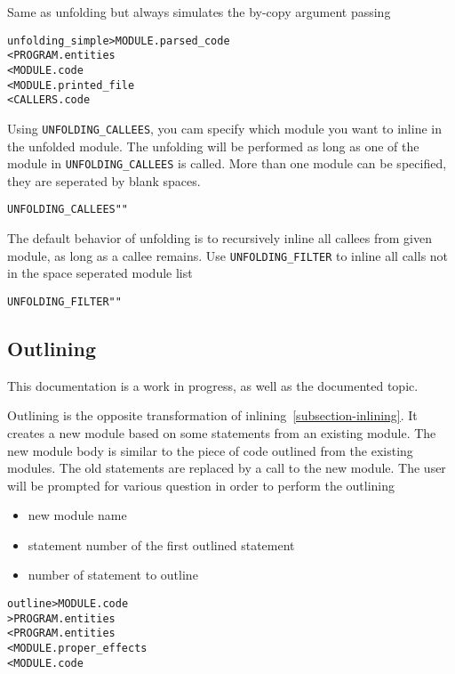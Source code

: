 \documentclass[a4paper]{report}
\newenvironment{PipsProp}{\begin{alltt}}{\end{alltt}}
\newenvironment{PipsMake}{\begin{alltt}}{\end{alltt}}
\begin{document}
Same as unfolding but always simulates the by-copy argument passing
\begin{PipsMake}

unfolding_simple      > MODULE.parsed_code
        < PROGRAM.entities
        < MODULE.code
        < MODULE.printed_file
        < CALLERS.code
\end{PipsMake}

Using \lstinline|UNFOLDING_CALLEES|, you cam specify which module you want to inline in the unfolded module.
The unfolding will be performed as long as one of the module in \lstinline|UNFOLDING_CALLEES| is called.
More than one module can be specified, they are seperated by blank spaces.
\begin{PipsProp}
UNFOLDING_CALLEES ""
\end{PipsProp}

The default behavior of unfolding is to recursively inline all callees from given module, as long as a callee remains. Use \lstinline|UNFOLDING_FILTER| to inline all calls not in the space seperated module list
\begin{PipsProp}
UNFOLDING_FILTER ""
\end{PipsProp}


\subsection{Outlining}
\label{subsection-outlining}

This documentation is a work in progress, as well as the documented topic.


Outlining is the opposite transformation of inlining~\ref{subsection-inlining}.
It creates a new module based on some statements from an existing module.
The new module body is similar to the piece of code outlined from the existing modules.
The old statements are replaced by a call to the new module.
The user will be prompted for various question in order to perform the outlining
\begin{itemize}
    \item new module name
    \item statement number of the first outlined statement
    \item number of statement to outline
\end{itemize}


\begin{PipsMake}

outline      > MODULE.code
        > PROGRAM.entities
        < PROGRAM.entities
        < MODULE.proper_effects
        < MODULE.code
\end{PipsMake}
\end{document}
